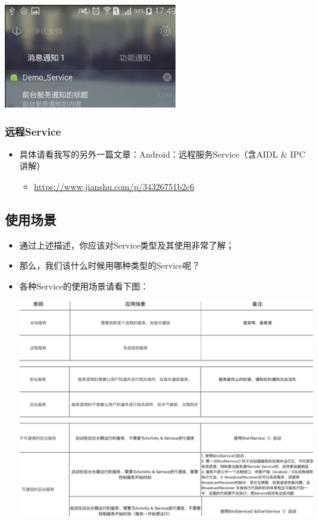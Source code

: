 \documentclass[9pt, b5paper]{article}
\begin{document}
\begin{enumerate}
\begin{itemize}
\includegraphics[width=.9\linewidth]{./pic/frontService.png}
\end{itemize}
\end{enumerate}
\subsubsection{远程Service}
\label{sec-3-4-4}
\begin{itemize}
\item 具体请看我写的另外一篇文章：Android：远程服务Service（含AIDL \& IPC讲解）
\begin{itemize}
\item \url{https://www.jianshu.com/p/34326751b2c6}
\end{itemize}
\end{itemize}
\subsection{使用场景}
\label{sec-3-5}
\begin{itemize}
\item 通过上述描述，你应该对Service类型及其使用非常了解；
\item 那么，我们该什么时候用哪种类型的Service呢？
\item 各种Service的使用场景请看下图：

\includegraphics[width=.9\linewidth]{./pic/use.png}
\end{itemize}
\end{document}
